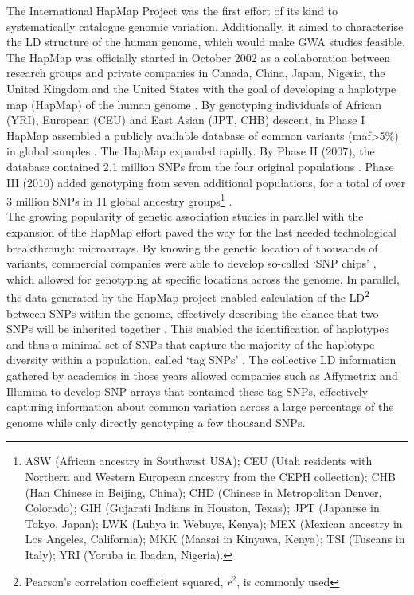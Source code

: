 The International HapMap Project was the first effort of its kind to systematically catalogue genomic variation. 
Additionally, it aimed to characterise the LD structure of the human genome, which would make GWA studies feasible. 
The HapMap was officially started in October 2002 as a collaboration between research groups and private companies in Canada, China, Japan, Nigeria, the United Kingdom and the United States with the goal of developing a haplotype map (HapMap) of the human genome \cite{international2003international}.
By genotyping individuals of African (YRI), European (CEU) and East Asian (JPT, CHB) descent, in Phase I HapMap assembled a publicly available database of common variants (\gls{maf}>5\%) in global samples \cite{international2005haplotype}. 
The HapMap expanded rapidly. 
By Phase II (2007), the database contained 2.1 million SNPs from the four original populations \cite{international2007second}.
Phase III (2010) added genotyping from seven additional populations, for a total of over 3 million SNPs in 11 global ancestry groups\footnote{ASW (African ancestry in Southwest USA); CEU (Utah residents with Northern and Western European ancestry from the CEPH collection); CHB (Han Chinese in Beijing, China); CHD (Chinese in Metropolitan Denver, Colorado); GIH (Gujarati Indians in Houston, Texas); JPT (Japanese in Tokyo, Japan); LWK (Luhya in Webuye, Kenya); MEX (Mexican ancestry in Los Angeles, California); MKK (Maasai in Kinyawa, Kenya); TSI (Tuscans in Italy); YRI (Yoruba in Ibadan, Nigeria).} \cite{international2010integrating}.\\ 

The growing popularity of genetic association studies in parallel with the expansion of the HapMap effort paved the way for the last needed technological breakthrough: microarrays.
By knowing the genetic location of thousands of variants, commercial companies were able to develop so-called `SNP chips' \cite{meaburn2006genotyping, oliphant2002beadarray}, which allowed for genotyping at specific locations across the genome.
In parallel, the data generated by the HapMap project enabled calculation of the LD\footnote{Pearson's correlation coefficient squared, $r^2$, is commonly used} between SNPs within the genome, effectively describing the chance that two SNPs will be inherited together \cite{bush2012genome}.
This enabled the identification of haplotypes and thus a minimal set of SNPs that capture the majority of the haplotype diversity within a population, called `tag SNPs' \cite{international2003international}. 
The collective LD information gathered by academics in those years \cite{slatkin2008linkage, pe2006evaluating, otto2002resolving} allowed companies such as Affymetrix and Illumina to develop SNP arrays that contained 
these tag SNPs, effectively capturing information about common variation across a large percentage of the genome while only directly genotyping a few thousand SNPs.\\

